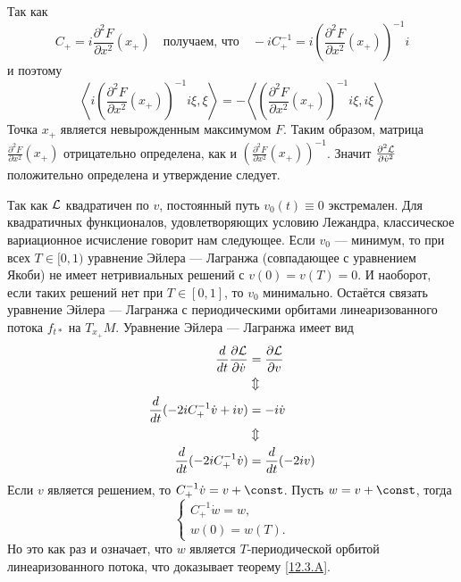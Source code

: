 Так как 
\[C_+=i\frac{\partial^2F}{\partial x^2}(x_+)
\quad\text{получаем, что}\quad
-iC_+^{-1}=i\left(\frac{\partial^2F}{\partial x^2}(x_+)\right)^{-1}i\]
и поэтому 
\[
\left\langle i\left(\frac{\partial^2F}{\partial x^2}(x_+)\right)^{-1}i\xi,\xi\right\rangle
=
-\left\langle \left(\frac{\partial^2F}{\partial x^2}(x_+)\right)^{-1}i\xi,i\xi\right\rangle
\]
Точка $x_+$ является невырожденным максимумом $F$.
Таким образом, матрица $\frac{\partial^2F}{\partial x^2}(x_+)$
отрицательно определена, как и $\left(\frac{\partial^2F}{\partial x^2}(x_+)\right)^{-1}$.
Значит $\tfrac{\partial^2\mathcal{L}}{\partial\dot v^2}$ положительно определена и утверждение следует.

Так как $\mathcal{L}$ квадратичен по $v$, постоянный путь $v_0(t) \equiv 0$ экстремален.
Для квадратичных функционалов, удовлетворяющих условию Лежандра, классическое вариационное исчисление говорит нам следующее.
Если $v_0$ --- минимум, то при всех $T \in [0, 1)$ уравнение Эйлера --- Лагранжа (совпадающее с уравнением Якоби) не имеет нетривиальных решений с $v(0) = v(T) = 0$.
И наоборот, если таких решений нет при $T\in[0, 1]$, то $v_0$ минимально.
Остаётся связать уравнение Эйлера --- Лагранжа с периодическими орбитами линеаризованного потока $f_{t*}$ на $T_{x_+}M$.
Уравнение Эйлера --- Лагранжа имеет вид
\begin{align*}
\frac{d}{d t}\frac{\partial \mathcal{L}}{\partial \dot v}
&=\frac{\partial \mathcal{L}}{\partial v}
\\
&\Updownarrow
\\
\frac{d}{d t}(-2iC_+^{-1}\dot v+iv)
&=-i\dot v
\\
&\Updownarrow
\\
\frac{d}{d t}(-2iC_+^{-1}\dot v)
&=
\frac{d}{d t}(-2iv)
\end{align*}
Если $v$ является решением, то $C_+^{-1}\dot v = v + \const$.
Пусть $w = v + \const$, тогда 
\[
\begin{cases}
C_+^{-1}\dot w=w,
\\
w(0)=w(T).
\end{cases}
\]
Но это как раз и означает, что $w$ является $T$-периодической орбитой линеаризованного потока, что доказывает теорему \ref{12.3.A}.
\qeds
